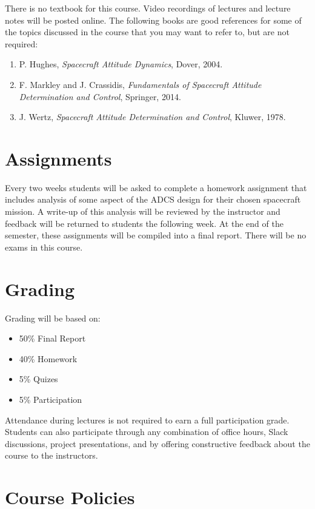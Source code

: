 \documentclass[11pt,letterpaper]{article}
\begin{document}
There is no textbook for this course. Video recordings of lectures and lecture notes will be posted online. The following books are good references for some of the topics discussed in the course that you may want to refer to, but are not required:

\begin{enumerate}
	\item P. Hughes, \textit{Spacecraft Attitude Dynamics}, Dover, 2004.
	\item F. Markley and J. Crassidis, \textit{Fundamentals of Spacecraft Attitude Determination and Control}, Springer, 2014.
	\item J. Wertz, \textit{Spacecraft Attitude Determination and Control}, Kluwer, 1978.
\end{enumerate}

\section*{Assignments}

Every two weeks students will be asked to complete a homework assignment that includes analysis of some aspect of the ADCS design for their chosen spacecraft mission. A write-up of this analysis will be reviewed by the instructor and feedback will be returned to students the following week. At the end of the semester, these assignments will be compiled into a final report. There will be no exams in this course.

\section*{Grading}

Grading will be based on:
\begin{itemize}
	\item 50\% Final Report
	\item 40\% Homework
	\item 5\% Quizes
	\item 5\% Participation
\end{itemize}
Attendance during lectures is not required to earn a full participation grade. Students can also participate through any combination of office hours, Slack discussions, project presentations, and by offering constructive feedback about the course to the instructors.


\section*{Course Policies}
\end{document}
